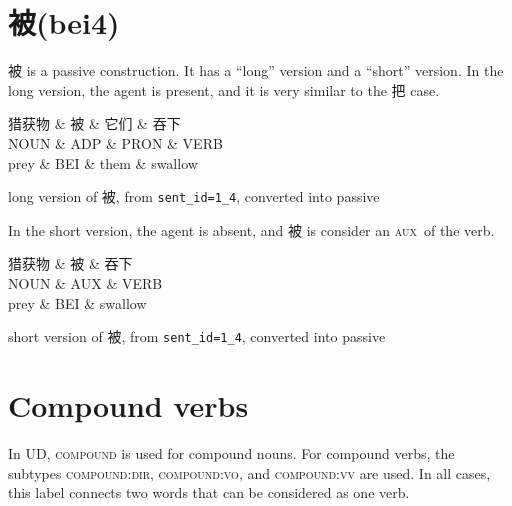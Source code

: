 \documentclass[UTF8,oneside]{book}
\def\aux{\textsc{aux}}
\begin{document}
\newpage
\section{被(bei4)}

被 is a passive construction. It has a ``long'' version and a ``short'' version. In the long version, the agent is present, and it is very similar to the 把 case. 

\begin{tree}[h]
\centering
\begin{dependency}[theme=simple]
\begin{deptext}[column sep=.5cm, row sep=.5ex]
猎获物 \& 被 \& 它们 \& 吞下 \\
NOUN \& ADP \& PRON \& VERB \\
prey \& BEI \& them \& swallow \\
\end{deptext}
\end{dependency}
\caption{long version of 被, from \texttt{sent\_id=1\_4}, converted into passive}
\end{tree}

In the short version, the agent is absent, and 被 is consider an \aux\ of the verb. 

\begin{tree}[h]
\centering
\begin{dependency}[theme=simple]
\begin{deptext}[column sep=.5cm, row sep=.5ex]
猎获物 \& 被 \& 吞下 \\
NOUN \& AUX \& VERB \\
prey \& BEI \& swallow \\
\end{deptext}
\end{dependency}
\caption{short version of 被, from \texttt{sent\_id=1\_4}, converted into passive}
\end{tree}

\newpage
\section{Compound verbs}

In UD, \textsc{compound} is used for compound nouns. For compound verbs, the subtypes \textsc{compound:dir}, \textsc{compound:vo}, and \textsc{compound:vv} are used. In all cases, this label connects two words that can be considered as one verb. 
\end{document}
